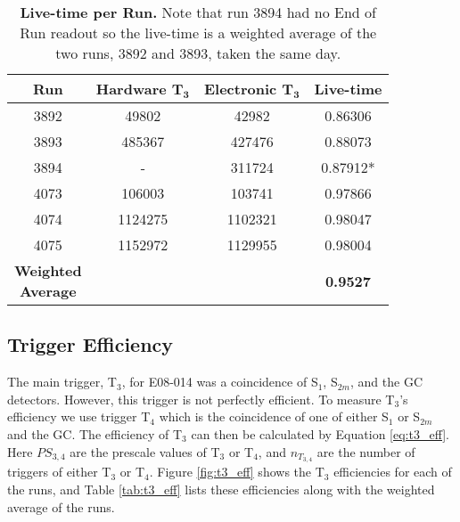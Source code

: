 \begin{table}[!h]
\centering
\begin{tabular}{|c c c c|}
\hline
\textbf{Run} & \makecell{\textbf{Hardware}\\ \textbf{$\boldsymbol{T_3}$}} & \makecell{\textbf{Electronic}\\ \textbf{$\boldsymbol{T_3}$}} & \textbf{Live-time}\\
\hline
3892 & 49802 & 42982 & 0.86306 \\
3893 & 485367 & 427476 & 0.88073 \\
3894 & - & 311724 & 0.87912* \\
4073 & 106003 & 103741 & 0.97866 \\
4074 & 1124275 & 1102321 & 0.98047 \\
4075 & 1152972 & 1129955 & 0.98004 \\  
\hline
\makecell{\textbf{Weighted}\\ \textbf{Average}} &  &  & \textbf{0.9527} \\
\hline
\end{tabular}
\caption[Live-time per Run]{{\bf{Live-time per Run.}} Note that run 3894 had no End of Run readout so the live-time is a weighted average of the two runs, 3892 and 3893, taken the same day.}
\label{tab:live-time}
\end{table}

\subsection{Trigger Efficiency}
\label{ssec:trigger_eff}

The main trigger, T$_3$, for E08-014 was a coincidence of S$_1$, S$_{2m}$, and the GC detectors. However, this trigger is not perfectly efficient. To measure T$_3$'s efficiency we use trigger T$_4$ which is the coincidence of one of either S$_1$ or S$_{2m}$ and the GC. The efficiency of T$_3$ can then be calculated by Equation \ref{eq:t3_eff}. Here $PS_{3,4}$ are the prescale values of T$_3$ or T$_4$, and $n_{T_{3,4}}$ are the number of triggers of either T$_3$ or T$_4$. Figure \ref{fig:t3_eff} shows the T$_3$ efficiencies for each of the runs, and Table \ref{tab:t3_eff} lists these efficiencies along with the weighted average of the runs. 

